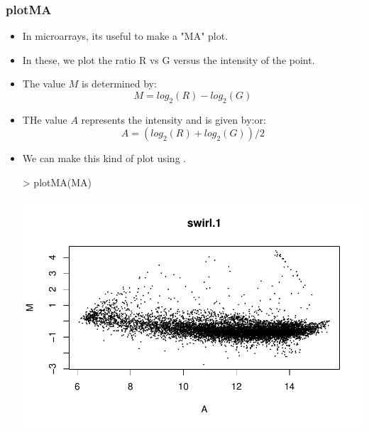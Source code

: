 \begin{frame}
  \frametitle{plotMA}
  \begin{itemize}
  \item In microarrays, its useful to make a "MA" plot.
  \item In these, we plot the ratio R vs G versus the intensity of the point.
  \item The value $M$ is determined by:
  \begin{displaymath}M = log_{2}(R) - log_{2}(G)
  \end{displaymath}
  \item THe value $A$ represents the intensity and is given by:or:
  \begin{displaymath}
  A = (log_{2}(R) + log_{2}(G))/2
  \end{displaymath}
  \item We can make this kind of plot using .
\begin{Schunk}
\begin{Sinput}
> plotMA(MA)
\end{Sinput}
\end{Schunk}
\includegraphics{plots/fig-023}
  \end{itemize}
\end{frame}

